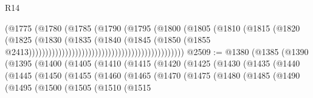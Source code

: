 \begin{lexlean}{R14}
\begin{coremodule}
                                                                (@1775
                                                                  (@1780
                                                                    (@1785
                                                                      (@1790
                                                                        (@1795
                                                                          (@1800
                                                                            (@1805
                                                                              (@1810
                                                                                (@1815
                                                                                  (@1820
                                                                                    (@1825
                                                                                      (@1830
                                                                                        (@1835
                                                                                          (@1840
                                                                                            (@1845
                                                                                              (@1850
                                                                                                (@1855
                                                                                                  @2413)))))))))))))))))))))))))))))))))))))))))))))))
@2509 := @1380
    (@1385
      (@1390
        (@1395
          (@1400
            (@1405
              (@1410
                (@1415
                  (@1420
                    (@1425
                      (@1430
                        (@1435
                          (@1440
                            (@1445
                              (@1450
                                (@1455
                                  (@1460
                                    (@1465
                                      (@1470
                                        (@1475
                                          (@1480
                                            (@1485
                                              (@1490
                                                (@1495
                                                  (@1500
                                                    (@1505
                                                      (@1510
                                                        (@1515

\end{coremodule}
\end{lexlean}
